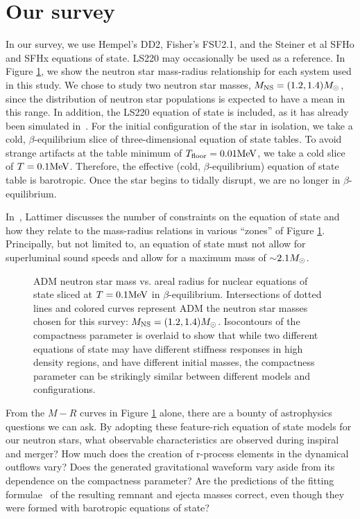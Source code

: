 \section{Our survey}

In our survey, we use Hempel's DD2, Fisher's FSU2.1, and the Steiner et al SFHo and SFHx equations of state.  
LS220 may occasionally be used as a reference. 
In Figure \ref{fig:MvsR}, we show the neutron star mass-radius relationship for each system used in this study. 
We chose to study two neutron star masses, $M_{\rm NS} = (1.2, 1.4) M_{\odot}$, since the distribution of neutron star populations is expected to have a mean in this range. 
In addition, the LS220 equation of state is included, as it has already been simulated in~\cite{Foucart:2014nda}.  
For the initial configuration of the star in isolation, we take a cold, $\beta$-equilibrium slice of three-dimensional equation of state tables.  
To avoid strange artifacts at the table minimum of $T_{\rm floor} = 0.01 {\rm MeV}$, we take a cold slice of  $T = 0.1 {\rm MeV}$.  Therefore, the effective (cold, $\beta$-equilibrium) equation of state table is barotropic. Once the star begins to tidally disrupt, we are no longer in $\beta$-equilibrium.

In~\cite{lattimer2016equation}, Lattimer discusses the number of constraints on the equation of state and how they relate to the mass-radius relations in various ``zones'' of Figure \ref{fig:MvsR}.  
Principally, but not limited to, an equation of state must not allow for superluminal sound speeds and allow for a maximum mass of $\mathord{\sim} 2.1 M_{\odot}$.

\begin{figure}
	\centering
	
	\caption[Neutron star mass vs. areal radius]{
		ADM neutron star mass vs. areal radius for nuclear equations of state sliced at $T=0.1{\rm MeV}$ in $\beta$-equilibrium.  Intersections of dotted lines and colored curves represent ADM the neutron star masses chosen for this survey: $M_{\rm NS} = (1.2, 1.4) M_{\odot}$.  Isocontours of the compactness parameter is overlaid to show that while two different equations of state may have different stiffness responses in high density regions, and have different initial masses, the compactness parameter can be strikingly similar between different models and configurations.
	}
	\label{fig:MvsR}
\end{figure}

From the $M-R$ curves in Figure \ref{fig:MvsR} alone, there are a bounty of astrophysics questions we can ask.  
By adopting these feature-rich equation of state models for our neutron stars, what observable characteristics are observed during inspiral and merger?  
How much does the creation of r-process elements in the dynamical outflows vary?  
Does the generated gravitational waveform vary aside from its dependence on the compactness parameter?  
Are the predictions of the fitting formulae~\cite{foucart2012black,pannarale2014black,kawaguchi2016models} of the resulting remnant and ejecta masses correct, even though they were formed with barotropic equations of state?

